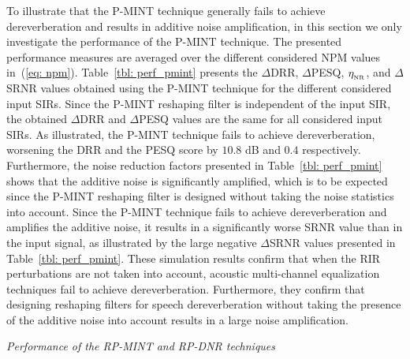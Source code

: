 \documentclass{aes60i}
\begin{document}
To illustrate that the P-MINT technique generally fails to achieve dereverberation and results in additive noise amplification, in this section we only investigate the performance of the P-MINT technique.
The presented performance measures are averaged over the different considered NPM values in~(\ref{eq: npm}).
Table~\ref{tbl: perf_pmint} presents the $\Delta$DRR, $\Delta$PESQ, $\eta_{_{\rm NR}}$, and $\Delta$SRNR values obtained using the P-MINT technique for the different considered input SIRs.
Since the P-MINT reshaping filter is independent of the input SIR, the obtained $\Delta$DRR and $\Delta$PESQ values are the same for all considered input SIRs.
As illustrated, the P-MINT technique fails to achieve dereverberation, worsening the DRR and the PESQ score by $10.8$ dB and $0.4$ respectively.
Furthermore, the noise reduction factors presented in Table~\ref{tbl: perf_pmint} shows that the additive noise is significantly amplified, which is to be expected since the P-MINT reshaping filter is designed without taking the noise statistics into account.
Since the P-MINT technique fails to achieve dereverberation and amplifies the additive noise, it results in a significantly worse SRNR value than in the input signal, as illustrated by the large negative $\Delta$SRNR values presented in Table~\ref{tbl: perf_pmint}.
These simulation results confirm that when the RIR perturbations are not taken into account, acoustic multi-channel equalization techniques fail to achieve dereverberation.
Furthermore, they confirm that designing reshaping filters for speech dereverberation without taking the presence of the additive noise into account results in a large noise amplification.

\textit{Performance of the RP-MINT and RP-DNR techniques}
\end{document}
